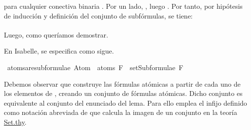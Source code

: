 \begin{isabellebody}
\begin{isamarkuptext}
\begin{demostracion}
     para cualquier conectiva binaria \isa{{\isacharasterisk}}. Por un lado, 
    , luego . Por tanto, por 
    hipótesis de inducción y definición del conjunto de subfórmulas, se tiene:\\
    \\
    Luego,  como queríamos demostrar.  
  \end{demostracion}

  En Isabelle, se especifica como sigue.%
\end{isamarkuptext}\isamarkuptrue%
\isamarkupfalse%
\ atoms{\isacharunderscore}are{\isacharunderscore}subformulae{\isacharcolon}\ {\isachardoublequoteopen}Atom\ {\isacharbackquote}\ atoms\ F\ {\isasymsubseteq}\ setSubformulae\ F{\isachardoublequoteclose}\isanewline
%
\isadelimproof
\ \ %
\endisadelimproof
%
\isatagproof
{}\isamarkupfalse%
%
\endisatagproof
{\isafoldproof}%
%
\isadelimproof
%
\endisadelimproof
%
\begin{isamarkuptext}%
Debemos observar que  construye las fórmulas atómicas a partir de cada uno de 
  los elementos de , creando un conjunto de fórmulas atómicas. Dicho conjunto es 
  equivalente al conjunto  del enunciado del lema. Para ello emplea el infijo \isa{{\isacharbackquote}} definido como 
  notación abreviada de \isa{{\isacharparenleft}{\isacharbackquote}{\isacharparenright}} que calcula la imagen de un conjunto en la teoría 
  \href{https://n9.cl/qatp}{Set.thy}.


\end{isamarkuptext}
\end{isabellebody}
